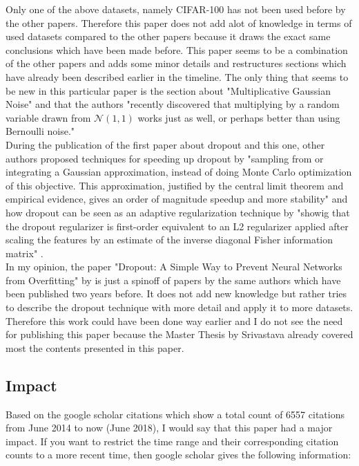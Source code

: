 \documentclass[a4paper]{article}
\begin{document}
Only one of the above datasets, namely CIFAR-100 has not been used before by the other papers. Therefore this paper does not add alot of knowledge in terms of used datasets compared to the other papers because it draws the exact same conclusions which have been made before. This paper seems to be a combination of the other papers and adds some minor details and restructures sections which have already been described earlier in the timeline. The only thing that seems to be new in this particular paper is the section about "Multiplicative Gaussian Noise" and that the authors "recently discovered that multiplying by a random variable drawn from $\mathcal{N}(1,1)$ works just as well, or perhaps better than using Bernoulli noise."\\
During the publication of the first paper about dropout \cite{DBLP:journals/corr/abs-1207-0580} and this one, other authors proposed techniques for speeding up dropout by "sampling from or integrating a Gaussian approximation, instead of doing Monte Carlo optimization of this objective. This approximation, justified by the central limit theorem and empirical evidence, gives an order of magnitude speedup and more stability" \cite{wang2013fast} and how dropout can be seen as an adaptive regularization technique by "showig that the dropout regularizer is first-order equivalent to an L2 regularizer applied after scaling the features by an estimate of the inverse diagonal Fisher information matrix" \cite{wager2013dropout}.\\

In my opinion, the paper "Dropout: A Simple Way to Prevent Neural Networks from Overfitting" by \cite{Srivastava:2014:DSW:2627435.2670313} is just a spinoff of papers by the same authors which have been published two years before. It does not add new knowledge but rather tries to describe the dropout technique with more detail and apply it to more datasets. Therefore this work could have been done way earlier and I do not see the need for publishing this paper because the Master Thesis by Srivastava already covered most the contents presented in this paper.




\subsection{Impact}

Based on the google scholar citations which show a total count of 6557 citations from June 2014 to now (June 2018), I would say that this paper had a major impact. If you want to restrict the time range and their corresponding citation counts to a more recent time, then google scholar gives the following information:
\end{document}

